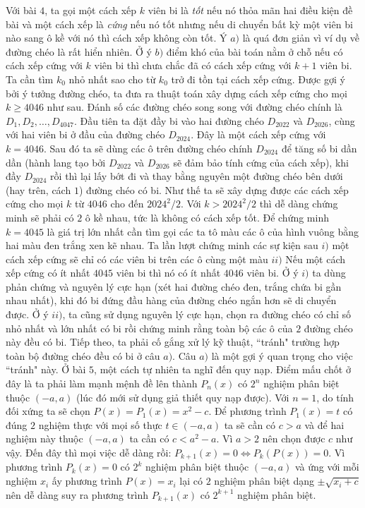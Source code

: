 \begin{multicols}{2}
	Với bài $4$, ta gọi một cách xếp $k$ viên bi là \textit{tốt} nếu nó thỏa mãn hai điều kiện đề bài và một cách xếp là \textit{cứng} nếu nó tốt nhưng nếu di chuyển bất kỳ một viên bi nào sang ô kề với nó thì cách xếp không còn tốt. Ý $a)$ là quá đơn giản vì ví dụ về đường chéo là rất hiển nhiên. Ở ý $b)$ điểm khó của bài toán nằm ở chỗ nếu có cách xếp cứng với $k$ viên bi thì chưa chắc đã có cách xếp cứng với $k+1$ viên bi. Ta cần tìm $k_0$ nhỏ nhất sao cho từ $k_0$  trở đi tồn tại cách xếp cứng. Được gợi ý bởi ý tưởng đường chéo, ta đưa ra thuật toán xây dựng cách xếp cứng cho mọi $k \ge 4046$ như sau. Đánh số các đường chéo song song với đường chéo chính là $D_1, D_2, \ldots, D_{4047}$. Đầu tiên ta đặt đầy bi vào hai đường chéo $D_{2022}$ và $D_{2026}$, cùng với hai viên bi ở đầu của đường chéo $D_{2024}$. Đây là một cách xếp cứng với $k = 4046$. Sau đó ta sẽ dùng các ô trên đường chéo chính $D_{2024}$ để tăng số bi dần dần (hành lang tạo bởi $D_{2022}$ và $D_{2026}$ sẽ đảm bảo tính cứng của cách xếp), khi đầy $D_{2024}$ rồi thì lại lấy bớt đi và thay bằng nguyên một đường chéo bên dưới (hay trên, cách $1$) đường chéo có bi. Như thế ta sẽ xây dựng được các cách xếp cứng cho mọi $k$ từ $4046$ cho đến $2024^2/2$. Với $k > 2024^2/2$ thì dễ dàng chứng minh sẽ phải có $2$ ô kề nhau, tức là không có cách xếp tốt. Để chứng minh $k = 4045$ là giá trị lớn nhất cần tìm gọi các ta tô màu các ô của hình vuông bằng hai màu đen trắng xen kẽ nhau. Ta lần lượt chứng minh các sự kiện sau $i)$ một cách xếp cứng sẽ chỉ có các viên bi trên các ô cùng một màu $ii)$ Nếu một cách xếp cứng có ít nhất $4045$ viên bi thì nó có ít nhất $4046$ viên bi. Ở ý $i)$ ta dùng phản chứng và nguyên lý cực hạn (xét hai đường chéo đen, trắng chứa bi gần nhau nhất), khi đó bi đứng đầu hàng của đường chéo ngắn hơn sẽ di chuyển được. Ở ý $ii)$, ta cũng sử dụng nguyên lý cực hạn, chọn ra đường chéo có chỉ số nhỏ nhất và lớn nhất có bi rồi chứng minh rằng toàn bộ các ô của $2$ đường chéo này đều có bi. Tiếp theo, ta phải cố gắng xử lý kỹ thuật, ``tránh" trường hợp toàn bộ đường chéo đều có bi ở câu $a)$. Câu $a)$ là một gợi ý quan trọng cho việc ``tránh" này. 
	\vskip 0.1cm
	Ở bài $5$, một cách tự nhiên ta nghĩ đến quy nạp. Điểm mấu chốt ở đây là ta phải làm mạnh mệnh đề lên thành $P_n(x)$ có $2^n$ nghiệm phân biệt thuộc $(-a, a)$ (lúc đó mới sử dụng giả thiết quy nạp được). Với $n = 1$, do tính đối xứng ta sẽ chọn $P(x) = P_1(x) = x^2 - c$. Để phương trình $P_1(x) = t$ có đúng $2$ nghiệm thực với mọi số thực $t \in (-a, a)$ ta sẽ cần có $c > a$ và để hai nghiệm này thuộc $(-a, a)$ ta cần có $c < a^2 - a$. Vì $a > 2$ nên chọn được $c$ như vậy. Đến đây thì mọi việc dễ dàng rồi:  $P_{k+1}(x) = 0 \Leftrightarrow P_k(P(x)) = 0$. Vì phương trình $P_k(x) = 0$ có $2^k$ nghiệm phân biệt thuộc $(-a, a)$ và ứng với mỗi nghiệm $x_i$ ấy phương trình $P(x) = x_i$ lại có $2$ nghiệm phân biệt dạng  $\pm\sqrt{x_i+c}$ nên dễ dàng suy ra phương trình $P_{k+1}(x)$ có $2^{k+1}$ nghiệm phân biệt.    

\end{multicols}
